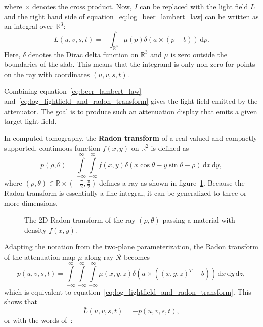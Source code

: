 where $\times$ denotes the cross product.
Now, $I$ can be replaced with the light field $L$ and the right hand side of equation~\ref{eq:log_beer_lambert_law} can be written as an integral over~$\mathbb{R}^3$:
\begin{equation}\label{eq:log_lightfield_and_radon_transform}
	\bar{L}(u, v, s, t) = 	%
	-\int_{\mathbb{R}^3} \mu(p) \delta ( a \times (p - b) ) \, \mathrm{d}p.
\end{equation}
Here, $\delta$ denotes the Dirac delta function on $\mathbb{R}^3$ and $\mu$ is zero outside the boundaries of the slab. 
This means that the integrand is only non-zero for points on the ray with coordinates $(u, v, s, t)$.

Combining equation~\ref{eq:beer_lambert_law} and~\ref{eq:log_lightfield_and_radon_transform} gives the light field emitted by the attenuator.
The goal is to produce such an attenuation display that emits a given target light field.

In computed tomography, the \textbf{Radon transform} of a real valued and compactly supported, continuous function $f(x, y)$ on $\mathbb{R}^2$ is defined as
\begin{equation}
	p(\rho, \theta) = 	
	\int \limits_{-\infty}^{\infty} 
		\int \limits_{-\infty}^{\infty}
			f(x, y) \delta (x \cos \theta - y \sin \theta - \rho) \, 
		\mathrm{d}x \,
	\mathrm{d}y,
\end{equation}
where $(\rho, \theta) \in \mathbb{R} \times \left(- \frac{\pi}{2}, \frac{\pi}{2}\right)$ defines a ray as shown in figure~\ref{fig:radon_transform_2D_sketch}.
Because the Radon transform is essentially a line integral, it can be generalized to three or more dimensions.
\begin{figure}[tb]
	\centering
	
	\caption[The Radon transform]
			{The 2D Radon transform of the ray $(\rho, \theta)$ passing a material with density $f(x, y)$.}
	\label{fig:radon_transform_2D_sketch}
\end{figure}
Adapting the notation from the two-plane parameterization, the Radon transform of the attenuation map $\mu$ along ray $\mathcal{R}$ becomes
\begin{equation}
	p(u, v, s, t) = 
	\int \limits_{-\infty}^{\infty} 
		\int \limits_{-\infty}^{\infty}
			\int \limits_{-\infty}^{\infty}
				\mu(x, y, z) \delta \left(a \times \left((x, y, z)^T - b\right) \right) \, 
			\mathrm{d}x \,
		\mathrm{d}y \,
	\mathrm{d}z, 
\end{equation}
which is equivalent to equation~\ref{eq:log_lightfield_and_radon_transform}.
This shows that
\begin{equation}\label{eq:log_light_field_negative_radon}
	\bar{L}(u, v, s, t) = -p(u, v, s, t), 
\end{equation}
or with the words of~\cite{WetzsteinTomo}: 

